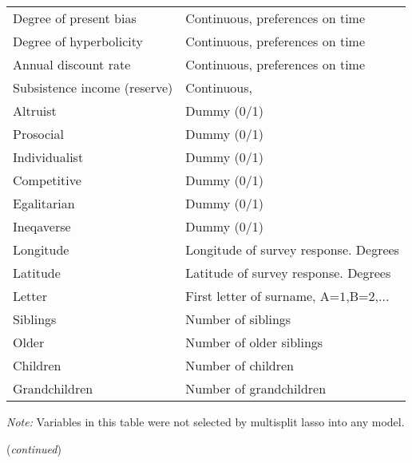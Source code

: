 \documentclass[a4paper,12pt]{article}
\begin{document}
{\begin{threeparttable}
\begin{small}
\begin{tabular}{ll}
\vspace{0.15cm}Degree of present bias&Continuous, preferences on time \\
\vspace{0.15cm}Degree of hyperbolicity&Continuous, preferences on time \\
\vspace{0.15cm}Annual discount rate&Continuous, preferences on time \\
\vspace{0.15cm}Subsistence income (reserve)&Continuous, \citet{bergson1954, bergson1938, samuelson1956}\\
\vspace{0.15cm}Altruist&Dummy (0/1)\\
\vspace{0.15cm}Prosocial&Dummy (0/1)\\
\vspace{0.15cm}Individualist&Dummy (0/1)\\
\vspace{0.15cm}Competitive&Dummy (0/1)\\
\vspace{0.15cm}Egalitarian&Dummy (0/1)\\
\vspace{0.15cm}Ineqaverse&Dummy (0/1)\\
\vspace{0.15cm}Longitude&Longitude of survey response. Degrees \\
\vspace{0.15cm}Latitude&Latitude of survey response. Degrees \\
\vspace{0.15cm}Letter&First letter of surname, A=$1$,B=$2$,...\\
\vspace{0.15cm}Siblings&Number of siblings\\
\vspace{0.15cm}Older&Number of older siblings\\
\vspace{0.15cm}Children&Number of children\\
Grandchildren&Number of grandchildren\\
\hline
\end{tabular} 
\end{small}
 \begin{tablenotes}
  \begin{footnotesize}
     \item[~]\textit{Note:} \vspace{-0.35cm} Variables in this table were not selected by multisplit lasso into any model.
      \\    \item[~]\hfill (\textit{continued})
\singlespacing
  \end{footnotesize}
   \end{tablenotes}
  \end{threeparttable} 
\par}
\end{document}
